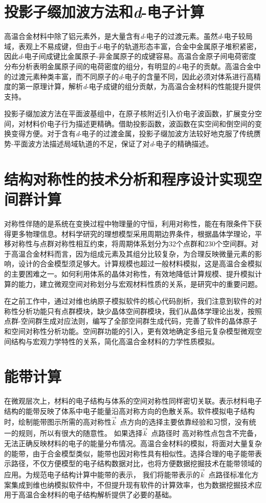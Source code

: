 \section{投影子缀加波方法和\textit{d}-电子计算}
高温合金材料中除了铝元素外，是大量含有\textit{d}-电子的过渡元素。虽然\textit{d}-电子较局域，表观上不易成键，但由于\textit{d}-电子的轨道形态丰富，合金中金属原子堆积紧密，因此\textit{d}-电子间成键比金属原子-非金属原子的成键容易。高温合金原子间电荷密度分布分析表明金属原子间的电荷密度的组分，有明显的\textit{d}-电子的贡献。高温合金中的过渡元素种类丰富，而不同原子的\textit{d}-电子的含量不同，因此必须对体系进行高精度的第一原理计算，解析\textit{d}-电子成键的组分贡献，为高温合金材料的性能提升提供支持。

投影子缀加波方法在平面波基组中，在原子核附近引入价电子波函数，扩展变分空间，对材料价电子行为描述更精确。借助投影函数，波函数在实空间和倒空间的变换变得方便。对于含有\textit{d}-电子的过渡金属，投影子缀加波方法较好地克服了传统赝势-平面波方法描述局域轨道的不足，保证了对\textit{d}-电子的精确描述。

\section{结构对称性的技术分析和程序设计实现空间群计算}
对称性伴随的是系统在变换过程中物理量的守恒，利用对称性，能在有限条件下获得更多物理信息。材料学研究的理想模型采用周期边界条件，根据晶体学理论，平移对称性与点群对称性相互约束，将周期体系划分为32个点群和230个空间群。对于高温合金材料而言，因为组成元素及其组分比较复杂，为合理反映微量元素的影响，设计的合金模型须足够大。计算规模也超过一般材料模拟，这是高温合金模拟的主要困难之一。如何利用体系的晶体对称性，有效地降低计算规模、提升模拟计算的能力，建立微观空间对称划分与宏观材料性质的关系，是研究中的重要问题。

在之前工作中，通过对维也纳原子模拟软件的核心代码剖析，我们注意到软件的对称性分析功能只有点群模块，缺少晶体空间群模块，我们从晶体学理论出发，按照点群-空间群生成对应法则，编写了全部空间群生成代码，完善了软件的晶体原子和空间对称性分析功能。空间群功能的引入，更有效地确定多组元复杂模型微观空间结构与宏观力学特性的关系，简化高温合金材料的力学性质模拟。

\section{能带计算}
在微观层次上，材料的电子结构与体系的空间对称性同样密切关联。表示材料电子结构的能带反映了体系中电子能量沿高对称方向的色散关系。软件模拟电子结构时，绘制能带图示所需的高对称性$\vec k$~点方向的选择主要依靠经验和习惯，没有统一的规则，所以有很大的随意性。%
如果选择$\vec k$~点路径时%
高对称性点包含不完备，无法正确反映材料的电子的能量分布情况。高温合金材料的模拟，将面对大量复杂的能带，由于合金模型类似，能带也因对称性具有相似性。选择合理的电子能带表示路径，不仅方便模型的电子结构数据对比，也将方便数据挖掘技术在能带领域的应用。为规范电子结构计算中能带的表示，%
我们将能带表示的$\vec k$~点路径标准化方案集成到维也纳模拟软件中，不但提升现有软件的计算效率，也为数据挖掘技术应用于高温合金材料的电子结构解析提供了必要的基础。


